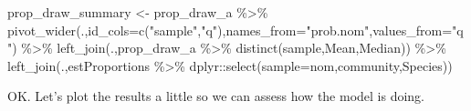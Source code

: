 \documentclass[
]{article}
\newenvironment{Shaded}{\begin{snugshade}}{\end{snugshade}}
\newcommand{\AttributeTok}[1]{\textcolor[rgb]{0.77,0.63,0.00}{#1}}
\newcommand{\FunctionTok}[1]{\textcolor[rgb]{0.00,0.00,0.00}{#1}}
\newcommand{\NormalTok}[1]{#1}
\newcommand{\OtherTok}[1]{\textcolor[rgb]{0.56,0.35,0.01}{#1}}
\newcommand{\SpecialCharTok}[1]{\textcolor[rgb]{0.00,0.00,0.00}{#1}}
\newcommand{\StringTok}[1]{\textcolor[rgb]{0.31,0.60,0.02}{#1}}
\begin{document}
\begin{Shaded}
\begin{Highlighting}[]
\NormalTok{prop\_draw\_summary }\OtherTok{\textless{}{-}}\NormalTok{ prop\_draw\_a }\SpecialCharTok{\%\textgreater{}\%} 
                      \FunctionTok{pivot\_wider}\NormalTok{(.,}\AttributeTok{id\_cols=}\FunctionTok{c}\NormalTok{(}\StringTok{"sample"}\NormalTok{,}\StringTok{"q"}\NormalTok{),}\AttributeTok{names\_from=}\StringTok{"prob.nom"}\NormalTok{,}\AttributeTok{values\_from=}\StringTok{"q"}\NormalTok{) }\SpecialCharTok{\%\textgreater{}\%}
                      \FunctionTok{left\_join}\NormalTok{(.,prop\_draw\_a }\SpecialCharTok{\%\textgreater{}\%} \FunctionTok{distinct}\NormalTok{(sample,Mean,Median)) }\SpecialCharTok{\%\textgreater{}\%}
                      \FunctionTok{left\_join}\NormalTok{(.,estProportions }\SpecialCharTok{\%\textgreater{}\%}\NormalTok{ dplyr}\SpecialCharTok{::}\FunctionTok{select}\NormalTok{(}\AttributeTok{sample=}\NormalTok{nom,community,Species))}
\end{Highlighting}
\end{Shaded}

OK. Let's plot the results a little so we can assess how the model is
doing.
\end{document}
